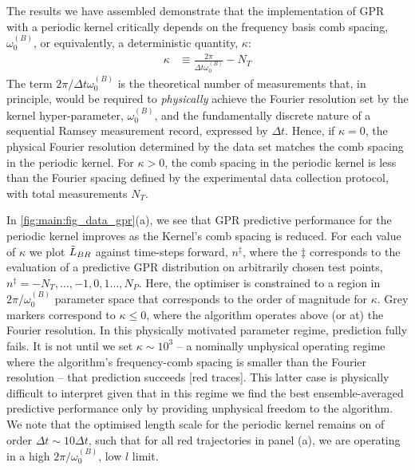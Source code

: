  The results we have assembled demonstrate that the implementation of GPR with a periodic kernel critically depends on the frequency basis comb spacing, $\omega_0^{(B)}$, or equivalently, a deterministic quantity, $\kappa$:
\begin{align}
\kappa & \equiv \frac{2\pi}{\Delta t \omega_0^{(B)}} - N_T 
\end{align}
The term $ 2\pi /  \Delta t \omega_0^{(B)}$ is the theoretical number of measurements that, in principle, would be required to \emph{physically} achieve the Fourier resolution set by the kernel hyper-parameter, $\omega_0^{(B)}$, and the fundamentally discrete nature of a sequential Ramsey measurement record, expressed by $\Delta t$. Hence, if $\kappa = 0$, the physical Fourier resolution determined by the data set matches the comb spacing in the periodic kernel. For $\kappa > 0$, the comb spacing in the periodic kernel is less than the Fourier spacing defined by the experimental data collection protocol, with total measurements $N_T$. 

In \cref{fig:main:fig_data_gpr}(a), we see that GPR predictive performance for the periodic kernel improves as the Kernel's comb spacing is reduced. For each value of $\kappa$ we plot $\tilde{L}_{BR}$ against time-steps forward, $n^\ddagger$, where the $\ddagger$ corresponds to the evaluation of a predictive GPR distribution on arbitrarily chosen test points, $n^\ddagger = -N_T, \hdots, -1, 0, 1 \hdots, N_P$. Here, the optimiser is constrained to a region in $2\pi/ \omega_0^{(B)}$ parameter space that corresponds to the order of magnitude for $\kappa$. Grey markers correspond to $\kappa \leq 0$, where the algorithm operates above (or at) the Fourier resolution.  In this physically motivated parameter regime, prediction fully fails.  It is not until we set $\kappa\sim10^{3}$ -- a nominally unphysical operating regime where the algorithm's frequency-comb spacing is smaller than the Fourier resolution -- that prediction succeeds [red traces]. This latter case is physically difficult to interpret given that in this regime we find the best ensemble-averaged predictive performance only by providing unphysical freedom to the algorithm.  We note that the optimised length scale for the periodic kernel remains on of order $ \Delta t \sim 10 \Delta t$, such that for all red trajectories in panel (a), we are operating in a high $2\pi/ \omega_0^{(B)}$, low $l$ limit. 

